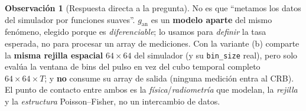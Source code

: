 \documentclass[11pt,a4paper]{article}
\theoremstyle{plain}
\theoremstyle{definition}
\newtheorem{remark}{Observaci\'on}
\begin{document}
\begin{remark}[Respuesta directa a la pregunta]
No es que ``metamos los datos del simulador por funciones suaves''.
$g_{\mathrm{an}}$ es un \textbf{modelo aparte} del mismo fen\'omeno, elegido
porque es \emph{diferenciable}; lo usamos para \emph{definir} la tasa esperada,
no para procesar un array de mediciones. Con la variante (b) comparte la
\textbf{misma rejilla espacial} $64\times64$ del simulador (y su
\texttt{bin\_size} real), pero solo eval\'ua la ventana de bins del pulso en vez
del cubo temporal completo $64\times64\times T$; y \textbf{no} consume su array
de salida (ninguna medici\'on entra al CRB). El punto de contacto entre ambos es
la \emph{f\'isica}/\emph{radiometr\'ia} que modelan, la \emph{rejilla} y la
\emph{estructura} Poisson--Fisher, no un intercambio de datos.
\end{remark}
\end{document}
